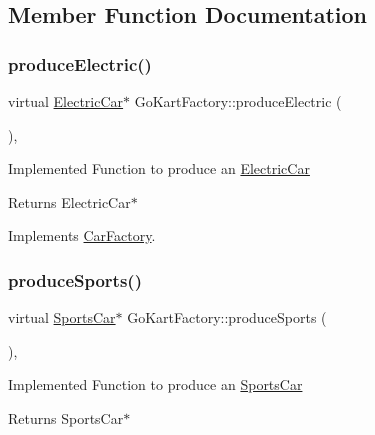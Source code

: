 \subsection{Member Function Documentation}
\mbox{\label{class_go_kart_factory_a936c39773bebc3bdd372d3a40f7ffd70}} 
\subsubsection{\texorpdfstring{produce\+Electric()}{produceElectric()}}
{\footnotesize\ttfamily virtual \mbox{\hyperlink{class_electric_car}{Electric\+Car}}$\ast$ Go\+Kart\+Factory\+::produce\+Electric (\begin{DoxyParamCaption}{ }\end{DoxyParamCaption})\hspace{0.3cm}{\ttfamily [inline]}, {\ttfamily [virtual]}}

Implemented Function to produce an \mbox{\hyperlink{class_electric_car}{Electric\+Car}} \begin{DoxyReturn}{Returns}
Electric\+Car$\ast$ 
\end{DoxyReturn}


Implements \mbox{\hyperlink{class_car_factory_a2a9be1558ef604f44ea3588bcc06b3db}{Car\+Factory}}.

\mbox{\label{class_go_kart_factory_a29dc434be1a5447b0ab321f9d9c0fb46}} 
\subsubsection{\texorpdfstring{produce\+Sports()}{produceSports()}}
{\footnotesize\ttfamily virtual \mbox{\hyperlink{class_sports_car}{Sports\+Car}}$\ast$ Go\+Kart\+Factory\+::produce\+Sports (\begin{DoxyParamCaption}{ }\end{DoxyParamCaption})\hspace{0.3cm}{\ttfamily [inline]}, {\ttfamily [virtual]}}

Implemented Function to produce an \mbox{\hyperlink{class_sports_car}{Sports\+Car}} \begin{DoxyReturn}{Returns}
Sports\+Car$\ast$ 
\end{DoxyReturn}


